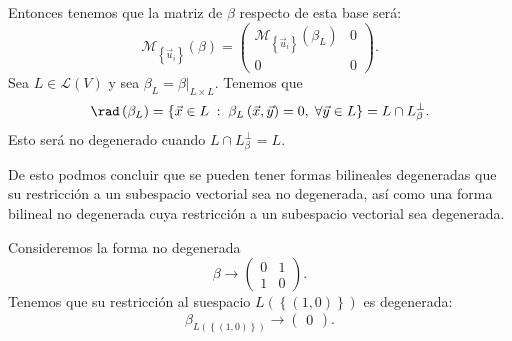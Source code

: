 Entonces tenemos que la matriz de $\displaystyle \beta  $ respecto de esta base será:
\[\mathcal{M}_{ \left\{ \vec{u}_{i}\right\} }\left(\beta \right) = \begin{pmatrix} \mathcal{M}_{ \left\{ \vec{u}_{i}\right\} }\left(\beta _{L}\right) & 0 \\
0 & 0\end{pmatrix} .\]
Sea $\displaystyle L \in \mathcal{L}\left(V\right) $ y sea $\displaystyle \beta_{L} = \beta|_{L \times L} $. Tenemos que 
\[ \rad\left(\beta_{L}\right) = \left\{ \vec{x} \in L \; : \; \beta_{L}\left(\vec{x}, \vec{y}\right) = 0, \; \forall \vec{y} \in L\right\} = L \cap L^{\perp }_{\beta} .\]
Esto será no degenerado cuando $\displaystyle L \cap L^{\perp }_{\beta }= L $.
\begin{observation}
\normalfont De esto podmos concluir que se pueden tener formas bilineales degeneradas que su restricción a un subespacio vectorial sea no degenerada, así como una forma bilineal no degenerada cuya restricción a un subespacio vectorial sea degenerada.
\end{observation}
\begin{eg}
\normalfont Consideremos la forma no degenerada
\[\beta \to \begin{pmatrix} 0 & 1 \\ 1 & 0 \end{pmatrix} .\]
Tenemos que su restricción al suespacio $\displaystyle L\left( \left\{ \left(1,0\right)\right\} \right) $ es degenerada:
\[ \beta_{L \left( \left\{ \left(1,0\right)\right\} \right)} \to \begin{pmatrix} 0 \end{pmatrix} .\]
\end{eg}

